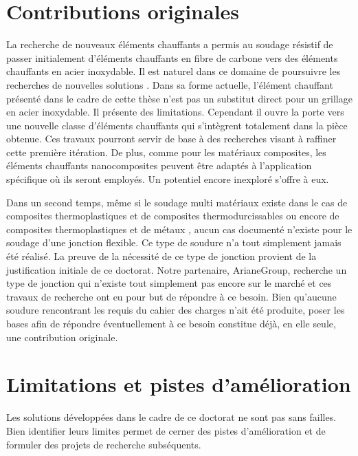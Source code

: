 \section{Contributions originales}

La recherche de nouveaux éléments chauffants a permis au soudage résistif de passer initialement d'éléments chauffants en fibre de carbone vers des éléments chauffants en acier inoxydable. 
Il est naturel dans ce domaine de poursuivre les recherches de nouvelles solutions \cite{Russello2019}. 
Dans sa forme actuelle, l'élément chauffant présenté dans le cadre de cette thèse n'est pas un substitut direct pour un grillage en acier inoxydable. 
Il présente des limitations.
Cependant il ouvre la porte vers une nouvelle classe d'éléments chauffants qui s'intègrent totalement dans la pièce obtenue. 
Ces travaux pourront servir de base à des recherches visant à raffiner cette première itération. 
De plus, comme pour les matériaux composites, les éléments chauffants nanocomposites peuvent être adaptés à l'application spécifique où ils seront employés. 
Un potentiel encore inexploré s'offre à eux. 

Dans un second temps, même si le soudage multi matériaux existe dans le cas de composites thermoplastiques et de composites thermodurcissables \cite{FernandezVillegas2015,Lionetto2018a} ou encore de composites thermoplastiques et de métaux \cite{Weidmann2018,Kruger2004,Balle2009,Goushegir2016}, aucun cas documenté n'existe pour le soudage d'une jonction flexible. 
Ce type de soudure n'a tout simplement jamais été réalisé. 
La preuve de la nécessité de ce type de jonction provient de la justification initiale de ce doctorat.
Notre partenaire, ArianeGroup, recherche un type de jonction qui n'existe tout simplement pas encore sur le marché et ces travaux de recherche ont eu pour but de répondre à ce besoin. 
Bien qu'aucune soudure rencontrant les requis du cahier des charges n'ait été produite, poser les bases afin de répondre éventuellement à ce besoin constitue déjà, en elle seule, une contribution originale. 

\section{Limitations et pistes d'amélioration}

Les solutions développées dans le cadre de ce doctorat ne sont pas sans failles. 
Bien identifier leurs limites permet de cerner des pistes d'amélioration et de formuler des projets de recherche subséquents. 

